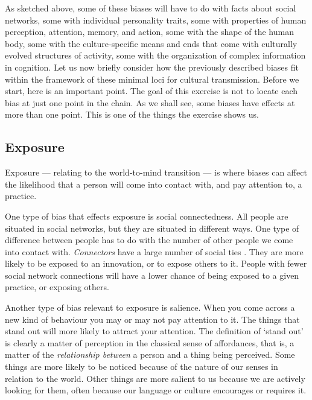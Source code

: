 As sketched above, some of these biases will have to do with facts about 
social networks, some with individual personality traits, some with 
properties of human perception, attention, memory, and action, some with 
the shape of the human body, some with the culture-specific means and 
ends that come with culturally evolved structures of activity, some with 
the organization of complex information in cognition. Let us now briefly 
consider how the previously described biases fit within 
the framework of these minimal loci for cultural transmission. Before we start, here is an important point. The goal of this exercise is not to locate each bias at just one point in the chain. As we shall see, some biases have effects at more than one point. This is one of the things the exercise shows us.


\subsection{Exposure}
Exposure --- relating to the world-to-mind transition --- is where 
biases can affect the likelihood that a person will come into contact 
with, and pay attention to, a practice.



One type of bias that effects exposure is social connectedness. All people are situated in social networks, 
but they are situated in different ways. One type of difference between 
people has to do with the number of other people we come into contact with. 
\textit{Connectors} have a large number of social ties \citep{granovetter_strength_1973}. They are more likely to be exposed to an 
innovation, or to expose others to it. People with fewer social network connections will have a 
lower chance of being exposed to a given practice, or exposing others. 



Another type of bias relevant to exposure is salience.  When you come across a new kind of behaviour you may or may not pay attention to it. The things that stand out will more likely to attract your attention. The definition of \textquoteleft stand out' is 
clearly a matter of perception in the classical sense of affordances, 
that is, a matter of the \textit{relationship between} a person and a thing being perceived. 
Some things are more likely to be noticed because of the nature of our 
senses in relation to the world. Other things are more 
salient to us because we are actively looking for them, often because our 
language or culture encourages or requires it.



